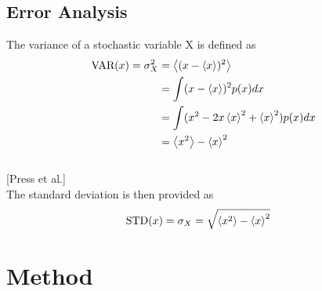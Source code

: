 \documentclass[%
reprint,nofootinbib,
amsmath,amssymb,
aps,
]{revtex4-1}
\begin{document}
\subsection*{Error Analysis}
\noindent 
The variance of a stochastic variable X is defined as\\
\begin{align}\label{var}
\textnormal{VAR}(x) = \sigma_X^2 &= \expval{(x-\expval{x})^2} \nonumber \\
&= \int(x-\expval{x})^2p(x)dx\nonumber\\
&= \int(x^2-2x\expval{x}^2+ \expval{x}^2)p(x)dx\nonumber\\
& = \expval{x^2} - \expval{x}^2 \nonumber \\ 
\end{align} \\
\hspace{6cm}[Press et al.]  \\ 
The standard deviation is then provided as \\ 
\begin{align}\label{std}
	\textnormal{STD}(x) = \sigma_X &= \sqrt{\expval{x^2} - \expval{x}^2 \nonumber } 
\end{align} 


\onecolumngrid
\newpage 
\section{Method} \noindent 
\twocolumngrid 
\noindent 
\end{document}
